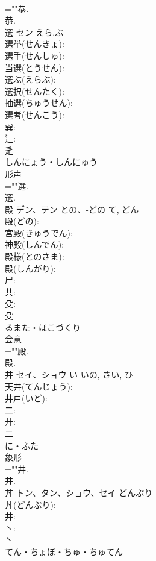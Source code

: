 \documentclass[8pt]{extreport}
\begin{document}
\begin{CJK}{UTF8}{min}
\\	=""恭.
\\	恭.
\\	選	セン	えら.ぶ		
\\	選挙(せんきょ): 
\\	選手(せんしゅ): 
\\	当選(とうせん): 
\\	選ぶ(えらぶ): 
\\	選択(せんたく): 
\\	抽選(ちゅうせん): 
\\	選考(せんこう): 
\\	巽: 
\\	辶: 
\\	辵	
\\	しんにょう・しんにゅう	
\\	形声 
\\	=""選.
\\	選.
\\	殿	デン、テン	との、-どの	て, どん	
\\	殿(どの): 
\\	宮殿(きゅうでん): 
\\	神殿(しんでん): 
\\	殿様(とのさま): 
\\	殿(しんがり): 
\\	尸: 
\\	共: 
\\	殳: 
\\	殳	
\\	るまた・ほこづくり	
\\	会意 
\\	=""殿.
\\	殿.
\\	井	セイ、ショウ	い	いの, さい, ひ	
\\	天井(てんじょう): 
\\	井戸(いど): 
\\	二: 
\\	廾: 
\\	二	
\\	に・ふた	
\\	象形 
\\	=""井.
\\	井.
\\	丼	トン、タン、ショウ、セイ	どんぶり		
\\	丼(どんぶり): 
\\	井: 
\\	丶: 
\\	丶	
\\	てん・ちょぼ・ちゅ・ちゅてん	

\end{CJK}
\end{document}
